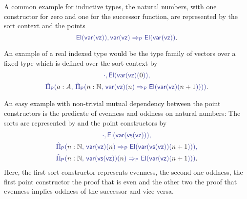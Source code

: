 \begin{example}\label{ex:if-natvec}
A common example for inductive types, the natural numbers, with one constructor for
zero and one for the successor function, are represented by the sort context
\tqm{\cdot_\Sc,\, \UU} and the points
\begin{equation*}
\tqm{\El(\var(\vz)), \var(\vz) \Rightarrow_\Pc \El(\var(\vz))} \text{.}
\end{equation*}

An example of a real indexed type would be the type family of vectors over a fixed
type  which is defined over the sort context
 by
\begin{equation*}
\begin{gathered}
\tqm{\cdot, \El(\var(\vz)(\blm{0})),}\\
\tqm{\ExtPiP{a : A}{\ExtPiP{n : \N}{\var(\vz)(\blm{n}) \Rightarrow_\Pc \El(\var(\vz)(\blm{n + 1}))}}} \text{.}
\end{gathered}
\end{equation*}

An easy example with non-trivial mutual dependency between the point constructors
is the predicate of evenness and oddness on natural numbers: The sorts are
represented by 
and the point constructors by
\begin{equation*}
\begin{gathered}
\tqm{\cdot , \El(\var(\vs(\vz))),} \\
\tqm{\ExtPiP{n : \N}{\var(\vz)(\blm{n}) \Rightarrow_\Pc \El(\var(\vs(\vz))(\blm{n + 1}))},} \\
\tqm{\ExtPiP{n:\N}{\var(\vs(\vz))(\blm{n}) \Rightarrow_\Pc \El(\var(\vz)(\blm{n + 1}))}} \text{.}
\end{gathered}
\end{equation*}
Here, the first sort constructor represents evenness, the second one oddness,
the first point constructor the proof that  is even and the other two the
proof that evenness implies oddness of the successor and vice versa.
\end{example}

